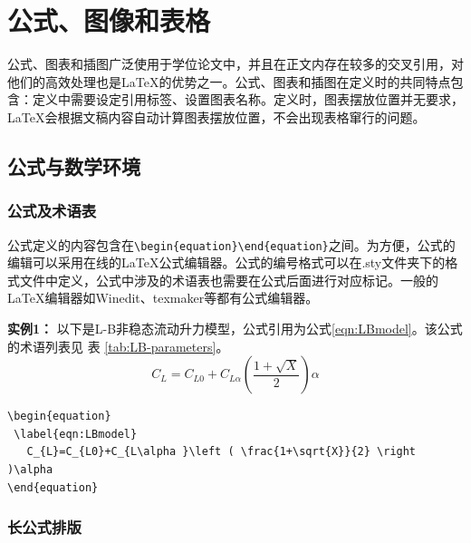 

\chapter{公式、图像和表格}
\label{chap:example}
公式、图表和插图广泛使用于学位论文中，并且在正文内存在较多的交叉引用，对他们的高效处理也是\LaTeX{}的优势之一。公式、图表和插图在定义时的共同特点包含：定义中需要设定引用标签、设置图表名称。定义时，图表摆放位置并无要求，\LaTeX{}会根据文稿内容自动计算图表摆放位置，不会出现表格窜行的问题。

\section{公式与数学环境}
\label{sec:eqn}

\subsection{公式及术语表}
\label{sec:eqn}

公式定义的内容包含在\verb|\begin{equation}|\verb|\end{equation}|之间。为方便，公式的编辑可以采用在线的\LaTeX{}公式编辑器。公式的编号格式可以在.sty文件夹下的格式文件中定义，公式中涉及的术语表也需要在公式后面进行对应标记。一般的\LaTeX{}编辑器如Winedit、texmaker等都有公式编辑器。

{\bf{实例1：}} 以下是L-B非稳态流动升力模型，公式引用为公式\ref{eqn:LBmodel}。该公式的术语列表见 表 \ref{tab:LB-parameters}。
\begin{equation}
 \label{eqn:LBmodel}
   C_{L}=C_{L0}+C_{L\alpha }\left ( \frac{1+\sqrt{X}}{2} \right )\alpha 
\end{equation}

\begin{lstlisting}[language={[LaTeX]TeX}, caption={L-B非稳态流动升力模型}]
\begin{equation}
 \label{eqn:LBmodel}
   C_{L}=C_{L0}+C_{L\alpha }\left ( \frac{1+\sqrt{X}}{2} \right )\alpha 
\end{equation}
\end{lstlisting}

\subsection{长公式排版}



